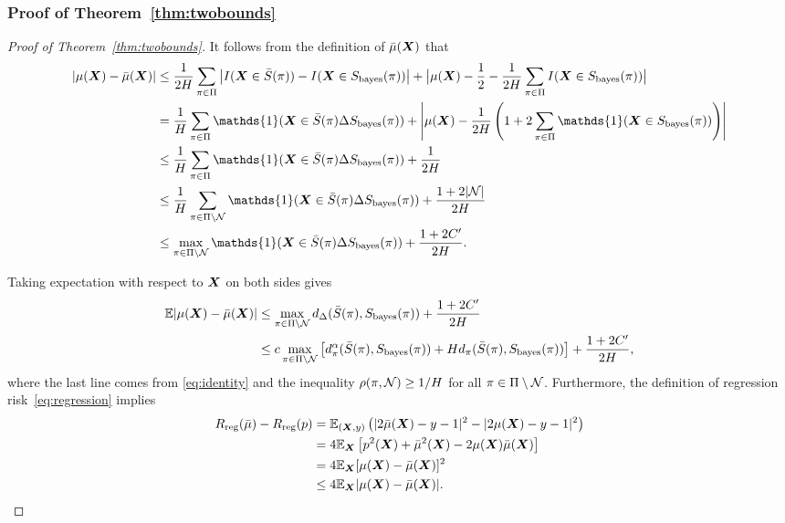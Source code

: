 \documentclass[11pt]{article}
\theoremstyle{plain}
\theoremstyle{definition}
\def\bayesS{S_{\textup{bayes}}}
\begin{document}
\subsubsection{Proof of Theorem~\ref{thm:twobounds}}
\begin{proof}[Proof of Theorem~\ref{thm:twobounds}]
It follows from the definition of $\bar \mu(\bm X)$ that
\begin{align}
|\mu(\mX)-\bar \mu(\mX)| &\leq {1\over 2H}\sum_{\pi \in \Pi}\left|I(\mX\in \bar S(\pi)) -I(\mX\in \bayesS(\pi))\right| + \big|\mu(\mX) - {1\over 2}-{1\over 2H}\sum_{\pi \in \Pi}I(\mX\in \bayesS(\pi))\big|\\
&= {1\over H}\sum_{\pi \in \Pi}\mathds{1}(\mX \in \bar S(\pi) \Delta \bayesS(\pi))+\left| \mu(\mX)-  {1\over 2H}\left(1+2\sum_{\pi \in \Pi}\mathds{1}(\mX \in \bayesS(\pi))\right) \right|\\
&\leq  {1\over H}\sum_{\pi \in \Pi}\mathds{1}(\mX \in \bar S(\pi) \Delta \bayesS(\pi))+ {1\over 2H}\\&\leq\frac{1}{H}\sum_{\pi\in\Pi\setminus\tN}\mathds{1}(\mX \in \bar S(\pi) \Delta \bayesS(\pi))+ {1+2|\tN|\over 2H}\\&\leq \max_{\pi\in\Pi\setminus\tN}\mathds{1}(\mX \in \bar S(\pi) \Delta \bayesS(\pi))+{1+2C'\over 2H}.
\end{align}

Taking expectation with respect to $\bm X$ on both sides gives
\begin{align}
\mathbb{E}|\mu(\mX)-\bar \mu(\mX)|&\leq \max_{\pi \in \Pi\setminus\tN}d_\Delta(\bar S(\pi), \bayesS(\pi))+{1+2C'\over 2H}\\&\leq c\max_{\pi \in \Pi\setminus\tN}\left[d_\pi^\alpha(\bar S(\pi), \bayesS(\pi))+Hd_\pi(\bar S(\pi), \bayesS(\pi))\right]+{1+2C'\over 2H},
\end{align}
where the last line comes from \eqref{eq:identity} and  the inequality $\rho(\pi,\mathcal{N})\geq 1/H$ for all $\pi\in\Pi\setminus\mathcal{N}$. 
Furthermore, the definition of regression risk~\eqref{eq:regression} implies
\begin{align}
R_\text{reg}(\bar \mu)-R_\text{reg}(p)&=\mathbb{E}_{(\bm X,y)}\left(|2\bar \mu(\bm X)-y-1|^2-|2\mu(\bm X)-y-1|^2\right)\\
&= 4\mathbb{E}_{\bm X}\left[p^2(\bm X)+\bar \mu^2(\bm X)-2\mu(\bm X)\bar \mu(\bm X)\right]\\
&=4\mathbb{E}_{\bm X}[\mu(\bm X)-\bar \mu(\bm X)]^2\\
&\leq 4\mathbb{E}_{\bm X}|\mu(\bm X)-\bar \mu(\bm X)|.
\end{align}
\end{proof}
\end{document}
